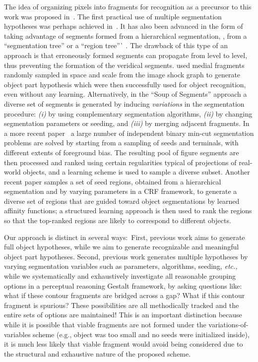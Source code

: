 The idea of organizing pixels into fragments for recognition as a precursor to this work was proposed in~\cite{Tamrakar:Kimia:POCV04}. The first practical use of multiple segmentation hypotheses was perhaps achieved in~\cite{Hoiem:etal:ICCV05}. It has also been advanced in the form of taking
advantage of segments formed from a hierarchical segmentation, \ie, from
a ``segmentation tree'' or a ``region tree'''~\cite{Todorovic:Ahuja:CVPR06,Todorovic:Ahuja:PAMI08,Arbelaez:etal:CVPR09}. The drawback of this type of an approach is that erroneously formed segments can propagate from level to level, thus preventing the formation of the veridical segments. \cite{Ozcanli:Kimia:BMVC07} used medial fragments randomly sampled in space and scale from the image shock graph to generate object part hypothesis which were then successfully used for object recognition, even without any learning. Alternatively, in the ``Soup of Segments'' approach \cite{Malisiewicz:Efros:BMVC07,Carreira:Sminchisescu:PAMI12,Endres:Hoiem:ECCV10}
a diverse set of segments is generated by inducing \textit{variations} in the segmentation procedure:
\textit{(i)} by using complementary segmentation algorithms, \textit{(ii)} by changing segmentation
parameters or seeding, and \textit{(iii)} by merging adjacent fragments.
In a more recent paper~\cite{Carreira:Sminchisescu:PAMI12}  a large number of independent binary min-cut segmentation problems are solved by starting
from  a sampling of seeds and terminals,  with different extents of foreground bias. The resulting pool of figure segments are then processed and ranked using certain regularities typical of projections of real-world objects, and a learning scheme is used to sample a diverse subset. Another recent paper
\cite{Endres:Hoiem:ECCV10} samples a set of seed regions, obtained from a hierarchical segmentation and by varying parameters in a CRF framework, 
to generate a diverse set of regions that are guided toward object segmentations by learned affinity functions; a structured learning approach is then used to rank the regions so that the top-ranked regions are likely to correspond to different objects.

Our approach is distinct in several ways:\   First,
previous work aims to generate full object hypotheses, while we aim to generate
recognizable and meaningful object part hypotheses. Second, previous work
generates multiple hypotheses by varying segmentation variables such as parameters, algorithms, seeding, {\emph{etc.,}} while we systematically and exhaustively investigate all reasonable
grouping options in a 
perceptual reasoning Gestalt framework, by asking questions like: what if these contour fragments are bridged across a gap? What if this contour fragment is spurious? These possibilities are all methodically tracked and the entire sets of options are maintained! This is an important distinction because while it is possible that viable fragments are not formed under the variations-of-variables scheme (e.g., object was too small and no seeds were initialized inside), it is much less likely that viable fragment would avoid being considered due to the structural and exhaustive nature of the proposed scheme.  

